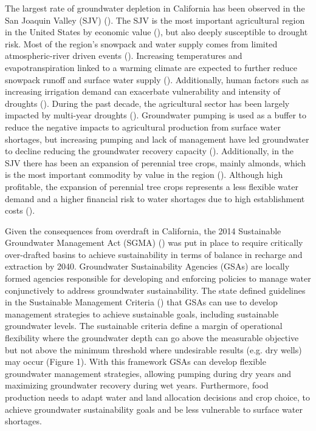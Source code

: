 \documentclass[11pt,a4paper]{article}
\begin{document}
The largest rate of groundwater depletion in California has been observed in the San Joaquin Valley (SJV) (\cite{ojha_sustained_2018}). The SJV is the most important agricultural region in the United States by economic value (\cite{usda_national_2020}), but also deeply susceptible to drought risk. Most of the region’s snowpack and water supply comes from limited atmospheric-river driven events (\cite{espinoza_global_2018}). Increasing temperatures and evapotranspiration linked to a warming climate are expected to further reduce snowpack runoff and surface water supply (\cite{fernandez-bou_regional_2021,vahmani_will_2022}). Additionally, human factors such as increasing irrigation demand can exacerbate vulnerability and intensity of droughts (\cite{he_intensification_2017}). During the past decade, the agricultural sector has been largely impacted by multi-year droughts (\cite{lund_lessons_2018,medellin-azuara_economic_2022}). Groundwater pumping is used as a buffer to reduce the negative impacts to agricultural production from surface water shortages, but increasing pumping and lack of management have led groundwater to decline reducing the groundwater recovery capacity (\cite{liu_groundwater_2022}).  Additionally, in the SJV there has been an expansion of perennial tree crops, mainly almonds, which is the most important commodity by value in the region (\cite{usda_national_2020}). Although high profitable, the expansion of perennial tree crops represents a less flexible water demand and a higher financial risk to water shortages due to high establishment costs (\cite{mall_water_2019,qin_flexibility_2019}).   

Given the consequences from overdraft in California, the 2014 Sustainable Groundwater Management Act (SGMA) (\cite{dwr_sustainable_2021}) was put in place to require critically over-drafted basins to achieve sustainability in terms of balance in recharge and extraction by 2040. Groundwater Sustainability Agencies (GSAs) are locally formed agencies responsible for developing and enforcing policies to manage water conjunctively to address groundwater sustainability. The state defined guidelines in the Sustainable Management Criteria (\cite{dwr_sustainable_2017}) that GSAs can use to develop management strategies to achieve sustainable goals, including sustainable groundwater levels. The sustainable criteria define a margin of operational flexibility where the groundwater depth can go above the measurable objective but not above the minimum threshold where undesirable results (e.g. dry wells) may occur (Figure 1). With this framework GSAs can develop flexible groundwater management strategies, allowing pumping during dry years and maximizing groundwater recovery during wet years. Furthermore, food production needs to adapt water and land allocation decisions and crop choice, to achieve groundwater sustainability goals and be less vulnerable to surface water shortages. 
\end{document}
